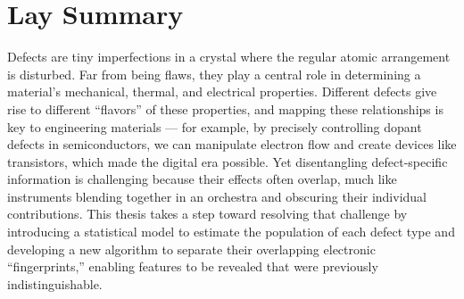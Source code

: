 

\chapter{Lay Summary}

Defects are tiny imperfections in a crystal where the regular atomic arrangement is disturbed. Far from being flaws, they play a central role in determining a material’s mechanical, thermal, and electrical properties. Different defects give rise to different “flavors” of these properties, and mapping these relationships is key to engineering materials — for example, by precisely controlling dopant defects in semiconductors, we can manipulate electron flow and create devices like transistors, which made the digital era possible. Yet disentangling defect-specific information is challenging because their effects often overlap, much like instruments blending together in an orchestra and obscuring their individual contributions. This thesis takes a step toward resolving that challenge by introducing a statistical model to estimate the population of each defect type and developing a new algorithm to separate their overlapping electronic “fingerprints,” enabling features to be revealed that were previously indistinguishable.
